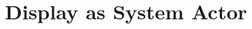 %
%
%
%
%
%
%
%
%
%
%
%
%
%
%
%
%
%
%
%
%
%

\chapter{Display as System Actor}
\label{chap:display_actor}

